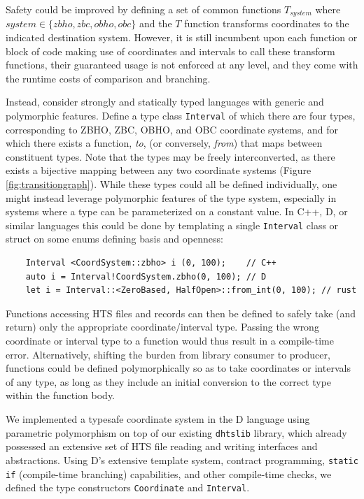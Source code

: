 \documentclass[12pt]{article}
\begin{document}
Safety could be improved by defining a set of common functions $T_{system}$ where $ system \in \{zbho, zbc, obho, obc\}$ and the $T$ function transforms coordinates to the indicated destination system. However, it is still incumbent upon each function or block of code making use of coordinates and intervals to call these transform functions, their guaranteed usage is not enforced at any level, and they come with the runtime costs of comparison and branching.

Instead, consider strongly and statically typed languages with generic and polymorphic features. Define a type class \texttt{Interval} of which there are four types, corresponding to ZBHO, ZBC, OBHO, and OBC coordinate systems, and for which there exists a function, \textit{to}, (or conversely, \textit{from}) that maps between constituent types. Note that the types may be freely interconverted, as there exists a bijective mapping between any two coordinate systems (Figure \ref{fig:transitiongraph}). While these types could all be defined individually, one might instead leverage polymorphic features of the type system, especially in systems where a type can be parameterized on a constant value. 
\filbreak
In C++, D, or similar languages this could be done by templating a single \texttt{Interval} class or struct on some enums defining basis and openness:
\begin{verbatim}
    Interval <CoordSystem::zbho> i (0, 100);    // C++
    auto i = Interval!CoordSystem.zbho(0, 100); // D
    let i = Interval::<ZeroBased, HalfOpen>::from_int(0, 100); // rust
\end{verbatim}

Functions accessing HTS files and records can then be defined to safely take (and return) only the appropriate coordinate/interval type. Passing the wrong coordinate or interval type to a function would thus result in a compile-time error. Alternatively, shifting the burden from library consumer to producer, functions could be defined polymorphically so as to take coordinates or intervals of any type, as long as they include an initial conversion to the correct type within the function body.


We implemented a typesafe coordinate system in the D language using parametric polymorphism on top of our existing \texttt{dhtslib}\cite{gregory_dhtslib_nodate} library, which already possessed an extensive set of HTS file reading and writing interfaces and abstractions. Using D’s extensive template system, contract programming, \texttt{static if} (compile-time branching) capabilities, and other compile-time checks, we defined the type constructors \texttt{Coordinate} and \texttt{Interval}.
\end{document}
